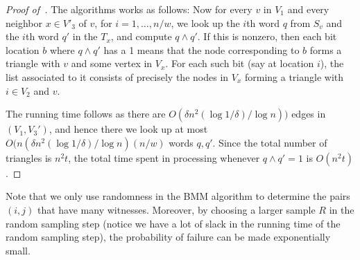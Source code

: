 \begin{proof}[Proof of~]
The algorithms works as follows: Now for every $v$ in $V_1$ and every neighbor $x \in V'_3$ of $v$, for $i=1,\ldots,n/w$, we look up
the $i$th word $q$ from $S_v$ and the $i$th word $q'$ in the $T_x$, and compute $q \wedge q'$. If this is nonzero, then each bit location $b$ where $q\wedge q'$ has a 1 means that the node corresponding to $b$ forms a triangle with $v$ and some vertex in $V_x$. For each such bit (say at location $i$), the list associated to it consists of precisely the nodes in $V_x$ forming a triangle with $i \in V_2$ and $v$.

The running time follows as there are $O(\delta n^2 (\log 1/\delta)/ \log n))$ edges in $(V_1,V_3')$, and hence there we look up at most $O(n (\delta n^2 (\log 1/\delta)/ \log n)  (n/w)$ words $q,q'$. Since the total number of triangles is $n^2 t$, the total time spent in processing whenever
 $q \wedge q'=1$ is $O(n^2 t)$.
\end{proof}


\begin{remark} Note that we only use randomness in the BMM algorithm  to determine the pairs $(i,j)$ that have many  witnesses.  Moreover, by choosing a larger sample $R$ in the random sampling step (notice we have a lot of slack in the running time of the random sampling step), the probability of failure can be made exponentially small.\end{remark}
